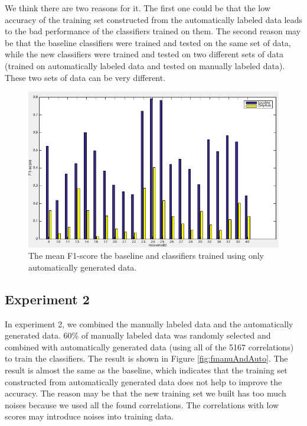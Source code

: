 \documentclass[conference, 11pt, onecolumn]{IEEEtran}
\begin{document}
We think there are two reasons for it. 
The first one could be that the low accuracy of the training set constructed from the automatically labeled data leads to the bad performance of the classifiers trained on them. The second reason may be that the baseline classifiers were trained and tested on the same set of data, while the new classifiers were trained and tested on two different sets of data (trained on automatically labeled data and tested on manually labeled data). These two sets of data can be very different.

\begin{figure}[h!]
\centering
\includegraphics[scale=0.45]{figure/fOnlyAuto.png}
\caption{The mean F1-score the baseline and classifiers trained using only automatically generated data.}
\label{fig:fOnlyAuto}
\end{figure}

\subsection{Experiment 2}
In experiment 2, we combined the manually labeled data and the automatically generated data. 60\% of manually labeled data was randomly selected and combined with automatically generated data (using all of the 5167 correlations) to train the classifiers. %
The result is shown in Figure \ref{fig:fmanuAndAuto}. The result is almost the same as the baseline, which indicates that the training set constructed from automatically generated data does not help to improve the accuracy. The reason may be that the new training set we built has too much noises because we used all the found correlations. The correlations with low scores may introduce noises into training data.
\end{document}
